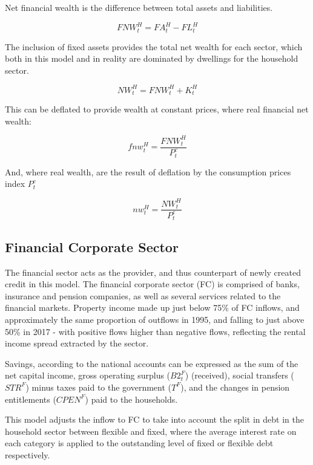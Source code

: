 \documentclass[
]{book}
\begin{document}
Net financial wealth is the difference between total assets and liabilities.

\begin{equation}
FNW^H_t = FA^H_t - FL^H_t
\end{equation}

The inclusion of fixed assets provides the total net wealth for each sector, which both in this model and in reality are dominated
by dwellings for the household sector.

\begin{equation}
NW^H_t = FNW^H_t + K^H_t
\end{equation}

This can be deflated to provide wealth at constant prices, where real financial net wealth:

\begin{equation}
fnw^H_t = \frac{FNW^H_t}{P^c_t}
\end{equation}

And, where real wealth, are the result of deflation by the consumption prices index \(P^c_t\)

\begin{equation}
nw^H_t = \frac{NW^H_t}{P^c_t}
\end{equation}

\hypertarget{sec:fi-fl-sfc-model-eq-f}{%
\subsection{Financial Corporate Sector}\label{sec:fi-fl-sfc-model-eq-f}}

The financial sector acts as the provider, and thus counterpart of newly created
credit in this model. The financial corporate sector (FC) is comprised of banks,
insurance and pension companies, as well as several services related to the financial
markets. Property income made up just below 75\% of FC inflows, and approximately the same
proportion of outflows in 1995, and falling to just above 50\% in 2017 - with positive
flows higher than negative flows, reflecting the rental income spread extracted by the
sector.

Savings, according to the national accounts can be expressed as the sum of the net
capital income, gross operating surplus (\(B2^F_t\)) (received), social transfers
(\(STR^F\)) minus taxes paid to the government (\(T^F\)), and the changes in pension entitlements
(\(CPEN^F\)) paid to the households.

This model adjusts the inflow to FC to take into account the split in debt in the household
sector between flexible and fixed, where the average interest rate on each category is applied
to the outstanding level of fixed or flexible debt respectively.
\end{document}

